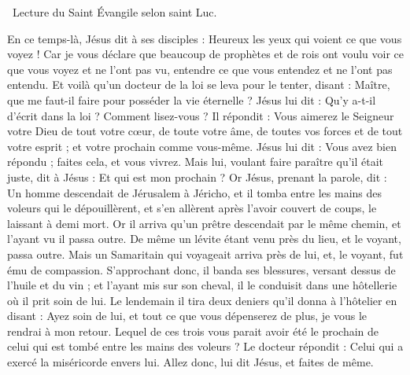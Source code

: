 \x~Lecture du Saint Évangile selon saint Luc.

En ce temps-là, Jésus dit à ses disciples : Heureux les yeux qui voient ce que vous voyez ! Car je vous déclare que beaucoup de prophètes et de rois ont voulu voir ce que vous voyez et ne l’ont pas vu, entendre ce que vous entendez et ne l’ont pas entendu. Et voilà qu’un docteur de la loi se leva pour le tenter, disant : Maître, que me faut-il faire pour posséder la vie éternelle ? Jésus lui dit : Qu’y a-t-il d’écrit dans la loi ? Comment lisez-vous ? Il répondit : Vous aimerez le Seigneur votre Dieu de tout votre cœur, de toute votre âme, de toutes vos forces et de tout votre esprit ; et votre prochain comme vous-même. Jésus lui dit : Vous avez bien répondu ; faites cela, et vous vivrez. Mais lui, voulant faire paraître qu’il était juste, dit à Jésus : Et qui est mon prochain ? Or Jésus, prenant la parole, dit : Un homme descendait de Jérusalem à Jéricho, et il tomba entre les mains des voleurs qui le dépouillèrent, et s’en allèrent après l’avoir couvert de coups, le laissant à demi mort. Or il arriva qu’un prêtre descendait par le même chemin, et l’ayant vu il passa outre. De même un lévite étant venu près du lieu, et le voyant, passa outre. Mais un Samaritain qui voyageait arriva près de lui, et, le voyant, fut ému de compassion. S’approchant donc, il banda ses blessures, versant dessus de l’huile et du vin ; et l’ayant mis sur son cheval, il le conduisit dans une hôtellerie où il prit soin de lui. Le lendemain il tira deux deniers qu’il donna à l’hôtelier en disant : Ayez soin de lui, et tout ce que vous dépenserez de plus, je vous le rendrai à mon retour. Lequel de ces trois vous parait avoir été le prochain de celui qui est tombé entre les mains des voleurs ? Le docteur répondit : Celui qui a exercé la miséricorde envers lui. Allez donc, lui dit Jésus, et faites de même.

